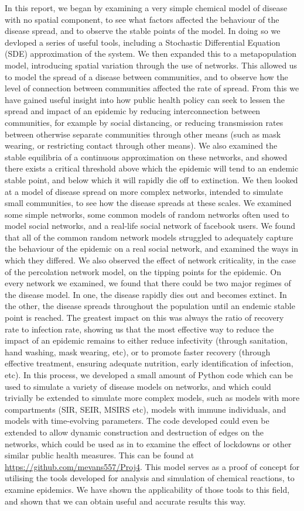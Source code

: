\documentclass[12pt,a4paper,openany,twoside]{book}
\begin{document}
In this report, we began by examining a very simple chemical model of disease with no spatial component, to see what factors affected the behaviour of the disease spread, and to observe the stable points of the model. In doing so we devloped a series of useful tools, including a Stochastic Differential Equation (SDE) approximation of the system. We then expanded this to a metapopulation model, introducing spatial variation through the use of networks. This allowed us to model the spread of a disease between communities, and to observe how the level of connection between communities affected the rate of spread. From this we have gained useful insight into how public health policy can seek to lessen the spread and impact of an epidemic by reducing interconnection between communities, for example by social distancing, or reducing transmission rates between otherwise separate communities through other means (such as mask wearing, or restricting contact through other means). We also examined the stable equilibria of a continuous approximation on these networks, and showed there exists a critical threshold above which the epidemic will tend to an endemic stable point, and below which it will rapidly die off to extinction. We then looked at a model of disease spread on more complex networks, intended to simulate small communities, to see how the disease spreads at these scales. We examined some simple networks, some common models of random networks often used to model social networks, and a real-life social network of facebook users. We found that all of the common random network models struggled to adequately capture the behaviour of the epidemic on a real social network, and examined the ways in which they differed. We also observed the effect of network criticality, in the case of the percolation network model, on the tipping points for the epidemic. On every network we examined, we found that there could be two major regimes of the disease model. In one, the disease rapidly dies out and becomes extinct. In the other, the disease spreads throughout the population until an endemic stable point is reached. The greatest impact on this was always the ratio of recovery rate to infection rate, showing us that the most effective way to reduce the impact of an epidemic remains to either reduce infectivity (through sanitation, hand washing, mask wearing, etc), or to promote faster recovery (through effective treatment, ensuring adequate nutrition, early identification of infection, etc). In this process, we developed a small amount of Python code which can be used to simulate a variety of disease models on networks, and which could trivially be extended to simulate more complex models, such as models with more compartments (SIR, SEIR, MSIRS etc), models with immune individuals, and models with time-evolving parameters. The code developed could even be extended to allow dynamic construction and destruction of edges on the networks, which could be used as in \citep{croccoloSpreadingInfectionsRandom2020} to examine the effect of lockdowns or other similar public health measures. This can be found at \url{https://github.com/mevans557/Proj4}. This model serves as a proof of concept for utilising the tools developed for analysis and simulation of chemical reactions, to examine epidemics. We have shown the applicability of those tools to this field, and shown that we can obtain useful and accurate results this way.


\end{document}
